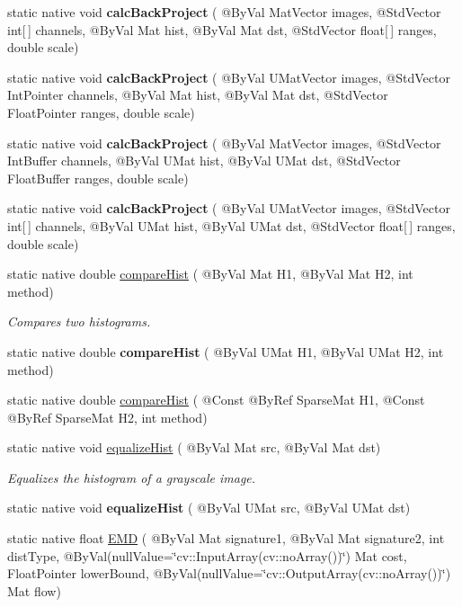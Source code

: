 \begin{DoxyCompactItemize}
\item 
static native void {\bfseries calc\+Back\+Project} ( @By\+Val Mat\+Vector images, @Std\+Vector int\mbox{[}$\,$\mbox{]} channels, @By\+Val Mat hist, @By\+Val Mat dst, @Std\+Vector float\mbox{[}$\,$\mbox{]} ranges, double scale)
\item 
static native void {\bfseries calc\+Back\+Project} ( @By\+Val U\+Mat\+Vector images, @Std\+Vector Int\+Pointer channels, @By\+Val Mat hist, @By\+Val Mat dst, @Std\+Vector Float\+Pointer ranges, double scale)
\item 
static native void {\bfseries calc\+Back\+Project} ( @By\+Val Mat\+Vector images, @Std\+Vector Int\+Buffer channels, @By\+Val U\+Mat hist, @By\+Val U\+Mat dst, @Std\+Vector Float\+Buffer ranges, double scale)
\item 
static native void {\bfseries calc\+Back\+Project} ( @By\+Val U\+Mat\+Vector images, @Std\+Vector int\mbox{[}$\,$\mbox{]} channels, @By\+Val U\+Mat hist, @By\+Val U\+Mat dst, @Std\+Vector float\mbox{[}$\,$\mbox{]} ranges, double scale)
\item 
static native double \hyperlink{group__imgproc__hist_ga2c5a33af2393e75272a7346241822627}{compare\+Hist} ( @By\+Val Mat H1, @By\+Val Mat H2, int method)
\begin{DoxyCompactList}\small\item\em Compares two histograms. \end{DoxyCompactList}\item 
static native double {\bfseries compare\+Hist} ( @By\+Val U\+Mat H1, @By\+Val U\+Mat H2, int method)
\item 
static native double \hyperlink{group__imgproc__hist_gadc2285df53903ac40eb1f3ac72136eb1}{compare\+Hist} ( @Const @By\+Ref Sparse\+Mat H1, @Const @By\+Ref Sparse\+Mat H2, int method)
\item 
static native void \hyperlink{group__imgproc__hist_gabfd0825b3947af498b1eecc64de2787c}{equalize\+Hist} ( @By\+Val Mat src, @By\+Val Mat dst)
\begin{DoxyCompactList}\small\item\em Equalizes the histogram of a grayscale image. \end{DoxyCompactList}\item 
static native void {\bfseries equalize\+Hist} ( @By\+Val U\+Mat src, @By\+Val U\+Mat dst)
\item 
static native float \hyperlink{group__imgproc__hist_ga754ea5294cd28cb142b11116e1c4d658}{E\+MD} ( @By\+Val Mat signature1, @By\+Val Mat signature2, int dist\+Type, @By\+Val(null\+Value=\char`\"{}cv\+::\+Input\+Array(cv\+::no\+Array())\char`\"{}) Mat cost, Float\+Pointer lower\+Bound, @By\+Val(null\+Value=\char`\"{}cv\+::\+Output\+Array(cv\+::no\+Array())\char`\"{}) Mat flow)

\end{DoxyCompactItemize}
